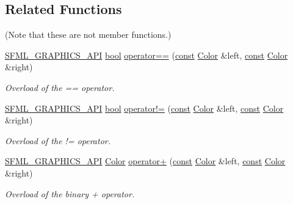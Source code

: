 \subsection*{Related Functions}
(Note that these are not member functions.) \begin{DoxyCompactItemize}
\item 
\hyperlink{sfml_2dep_2_s_f_m_l-2_84_82_2include_2_s_f_m_l_2_graphics_2_export_8hpp_ab84c9f1035e146917de3bc0f98d72b35}{S\-F\-M\-L\-\_\-\-G\-R\-A\-P\-H\-I\-C\-S\-\_\-\-A\-P\-I} \hyperlink{term__entry_8h_a002004ba5d663f149f6c38064926abac}{bool} \hyperlink{classsf_1_1_color_a7498d4670c7655e8d4d91ef49cc6064e}{operator==} (\hyperlink{term__entry_8h_a57bd63ce7f9a353488880e3de6692d5a}{const} \hyperlink{classsf_1_1_color}{Color} \&left, \hyperlink{term__entry_8h_a57bd63ce7f9a353488880e3de6692d5a}{const} \hyperlink{classsf_1_1_color}{Color} \&right)
\begin{DoxyCompactList}\small\item\em Overload of the == operator. \end{DoxyCompactList}\item 
\hyperlink{sfml_2dep_2_s_f_m_l-2_84_82_2include_2_s_f_m_l_2_graphics_2_export_8hpp_ab84c9f1035e146917de3bc0f98d72b35}{S\-F\-M\-L\-\_\-\-G\-R\-A\-P\-H\-I\-C\-S\-\_\-\-A\-P\-I} \hyperlink{term__entry_8h_a002004ba5d663f149f6c38064926abac}{bool} \hyperlink{classsf_1_1_color_a5d6501b7dd05f481b79f7163899f1d92}{operator!=} (\hyperlink{term__entry_8h_a57bd63ce7f9a353488880e3de6692d5a}{const} \hyperlink{classsf_1_1_color}{Color} \&left, \hyperlink{term__entry_8h_a57bd63ce7f9a353488880e3de6692d5a}{const} \hyperlink{classsf_1_1_color}{Color} \&right)
\begin{DoxyCompactList}\small\item\em Overload of the != operator. \end{DoxyCompactList}\item 
\hyperlink{sfml_2dep_2_s_f_m_l-2_84_82_2include_2_s_f_m_l_2_graphics_2_export_8hpp_ab84c9f1035e146917de3bc0f98d72b35}{S\-F\-M\-L\-\_\-\-G\-R\-A\-P\-H\-I\-C\-S\-\_\-\-A\-P\-I} \hyperlink{classsf_1_1_color}{Color} \hyperlink{classsf_1_1_color_a90e79ecc276114cda519a88119ac645b}{operator+} (\hyperlink{term__entry_8h_a57bd63ce7f9a353488880e3de6692d5a}{const} \hyperlink{classsf_1_1_color}{Color} \&left, \hyperlink{term__entry_8h_a57bd63ce7f9a353488880e3de6692d5a}{const} \hyperlink{classsf_1_1_color}{Color} \&right)
\begin{DoxyCompactList}\small\item\em Overload of the binary + operator. \end{DoxyCompactList}\item 

\end{DoxyCompactItemize}
